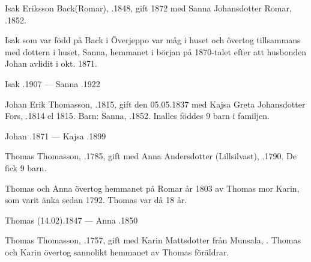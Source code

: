Isak Eriksson Back(Romar), .1848, gift 1872 med Sanna Johansdotter Romar, .1852.
\begin{jhchildren}
  \item {}
  \item {}
  \item {}
  \item {}
  \item {}
  \item {}
  \item {}
\end{jhchildren}
Isak som var född på Back i Överjeppo var måg i huset och övertog tillsammans med dottern i huset, Sanna, hemmanet i början på 1870-talet efter att husbonden Johan avlidit i okt. 1871.

Isak .1907  ---  Sanna .1922


Johan Erik Thomasson, .1815, gift den 05.05.1837 med Kajsa Greta Johansdotter Fors, .1814 el 1815.
Barn: Sanna, .1852. Inalles föddes 9 barn i familjen.

Johan .1871  ---  Kajsa .1899


Thomas Thomasson, .1785, gift med Anna Andersdotter (Lillsilvast), .1790. De fick 9 barn.
\begin{jhchildren}
  \item {}
  \item {}
\end{jhchildren}
Thomas och Anna övertog hemmanet på Romar år 1803 av Thomas mor Karin, som varit änka sedan 1792. Thomas var då 18 år.

Thomas (14.02).1847  ---  Anna .1850


Thomas Thomasson, .1757, gift med Karin Mattsdotter från Munsala, . Thomas och Karin övertog sannolikt hemmanet av Thomas föräldrar.
\begin{jhchildren}
  \item {}
  \item {}
\end{jhchildren}

